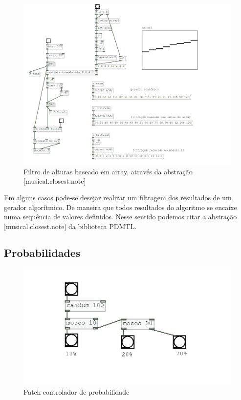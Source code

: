 \documentclass[draft]{ppgmus}
\begin{document}
\begin{figure}
\includegraphics[scale=.6]{filtro-alturas}
\caption{Filtro de alturas baseado em array, através da abstração [musical.closest.note]}
\label{filtro-alturas}
\end{figure}  

Em alguns casos pode-se desejar realizar um filtragem
dos resultados de um gerador algorítmico. De maneira que
todos resultados do algoritmo se encaixe numa sequência
de valores definidos. Nesse sentido podemos citar a abstração
[musical.closest.note] da biblioteca PDMTL.




\subsection{Probabilidades}

\begin{figure}
\includegraphics[scale=.6]{probabilidade-simples}
\caption{Patch controlador de probabilidade}
\label{prob-simples}
\end{figure}  
\end{document}
